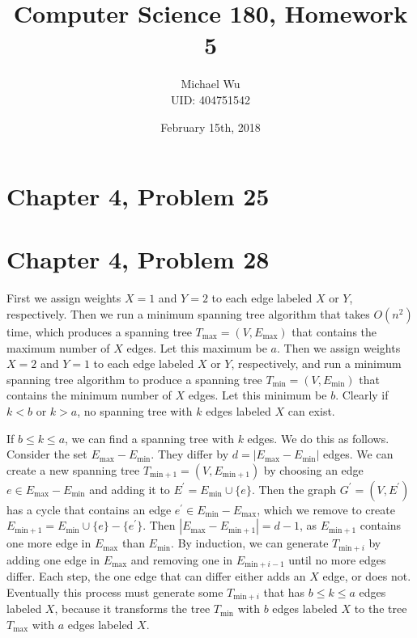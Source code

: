 \documentclass[12pt]{article}
\begin{document}
\title{Computer Science 180, Homework 5}
\date{February 15th, 2018}
\author{Michael Wu\\UID: 404751542}
\maketitle

\section*{Chapter 4, Problem 25}

\pagebreak

\section*{Chapter 4, Problem 28}

First we assign weights \(X=1\) and \(Y=2\) to each edge labeled \(X\) or \(Y\), respectively. Then we run a minimum spanning tree
algorithm that takes \(O(n^2)\) time, which produces a spanning tree \(T_\text{max}=(V,E_\text{max})\) that contains the maximum
number of \(X\) edges. Let this maximum be \(a\). Then we assign weights \(X=2\) and \(Y=1\) to each edge labeled \(X\) or \(Y\),
respectively, and run a minimum spanning tree algorithm to produce a spanning tree \(T_\text{min}=(V,E_\text{min})\) that contains
the minimum number of \(X\) edges. Let this minimum be \(b\). Clearly if \(k<b\) or \(k>a\), no spanning tree with \(k\) edges labeled
\(X\) can exist.

If \(b\leq k \leq a\), we can find a spanning tree with \(k\) edges. We do this as follows. Consider the set
\(E_\text{max}-E_\text{min}\). They differ by \(d=|E_\text{max}-E_\text{min}|\) edges. We can create a new spanning tree \(T_{\text{min}+1}=(V,E_{\text{min}+1})\)
by choosing an edge \(e\in E_\text{max}-E_\text{min}\) and adding it to \(E^\prime = E_\text{min}\cup \{e\}\). Then the graph \(G^\prime=(V,E^\prime)\)
has a cycle that contains an edge \(e^\prime\in E_\text{min}-E_\text{max}\), which we remove to create \(E_{\text{min}+1} = E_\text{min}\cup \{e\}-\{e^\prime\}\).
Then \(|E_\text{max}-E_{\text{min}+1}|=d-1\), as \(E_{\text{min}+1}\) contains one more edge in \(E_\text{max}\) than \(E_\text{min}\). By induction,
we can generate \(T_{\text{min}+i}\) by adding one edge in \(E_\text{max}\) and removing one in \(E_{\text{min}+i-1}\) until no more edges differ.
Each step, the one edge that can differ either adds an \(X\) edge, or does not. Eventually this process must generate some \(T_{\text{min}+i}\) that
has \(b\leq k\leq a\) edges labeled \(X\), because it transforms the tree \(T_\text{min}\) with \(b\) edges labeled \(X\) to the tree \(T_\text{max}\) with \(a\) edges
labeled \(X\).
\end{document}
